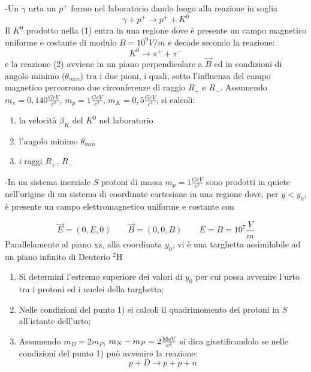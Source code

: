 \documentclass[12pt,twoside,a4]{article}
\begin{document}
\begin{esercizio}
	-Un $\gamma$ urta un $p^+$ fermo nel laboratorio dando luogo alla reazione in soglia 
	\begin{equation*}
		\gamma + p^+ \rightarrow p^+ +K^0
	\end{equation*}
Il $K^0$ prodotto nella (1) entra in una regione dove è presente un campo magnetico uniforme e costante di modulo $B = 10^9V/m$ e decade secondo la reazione:
\begin{equation*}
	K^0 \rightarrow \pi^+ + \pi^-
\end{equation*}
e la reazione (2) avviene in un piano perpendicolare a $\vec B$ ed in condizioni di angolo minimo ($\theta_{min}$) tra i due pioni, i quali, sotto l'influenza del campo magnetico percorrono due circonferenze di raggio $R_+$ e $R_-$. Assumendo $m_\pi=0,140 \frac{GeV}{c^2}$, $m_p=1 \frac{GeV}{c^2}$, $m_K=0,5 \frac{GeV}{c^2}$, si calcoli:
\begin{enumerate}[label=(\textit{\roman*})]
	\item la velocità $\beta_K$ del $K^0$ nel laboratorio
	\item l'angolo minimo $\theta_{min}$
	\item i raggi $R_+$, $R_-$ 
\end{enumerate}
\end{esercizio}

\begin{esercizio}
	-In un sistema inerziale $S$ protoni di massa $m_p = 1\frac{GeV}{c^2}$ sono prodotti in quiete nell'origine di un sistema di coordinate cartesiane in una regione dove, per $y < y_0$, è presente un campo elettromagnetico uniforme e costante con
	
	\begin{equation} 
		\vec E =(0,E,0) \qquad \vec B = (0,0,B) \qquad E=B=10^7 \frac{V}{m}
	\end{equation}
Parallelamente al piano xz, alla coordinata $y_0$, vi è una targhetta assimilabile ad un piano infinito di Deuterio $\mathrm{^2H}$
\begin{enumerate}[label=(\textit{\roman*})]
	\item Si determini l'estremo superiore dei valori di $y_0$ per cui possa avvenire l'urto tra i protoni ed i nuclei della targhetta;
	\item Nelle condizioni del punto 1) si calcoli il quadrimomento dei protoni in $S$ all'istante dell'urto;
	\item Assumendo $m_D=2m_P$, $m_N-m_P=2 \frac{\mathrm{MeV}}{c^2}$ si dica giustificandolo se nelle condizioni del punto 1) può avvenire la reazione:
	\begin{equation}
	p + D \rightarrow p +p +n	
	\end{equation}
\end{enumerate}
\end{esercizio}
\end{document}
